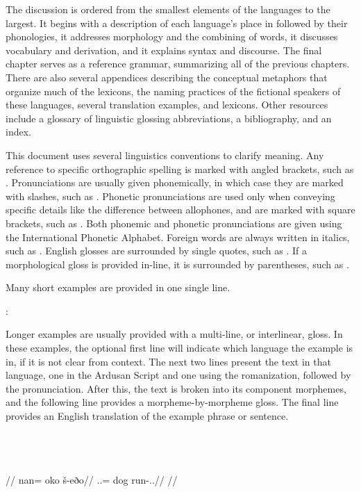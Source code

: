 The discussion is ordered from the smallest elements of the languages to the largest. It begins with a description of each language's place in \landn{} followed by their phonologies, it addresses morphology and the combining of words, it discusses vocabulary and derivation, and it explains syntax and discourse. The final chapter serves as a reference grammar, summarizing all of the previous chapters. There are also several appendices describing the conceptual metaphors that organize much of the lexicons, the naming practices of the fictional speakers of these languages, several translation examples, and lexicons. Other resources include a glossary of linguistic glossing abbreviations, a bibliography, and an index.

This document uses several linguistics conventions to clarify meaning. Any reference to specific orthographic spelling is marked with angled brackets, such as . Pronunciations are usually given phonemically, in which case they are marked with slashes, such as . Phonetic pronunciations are used only when conveying specific details like the difference between allophones, and are marked with square brackets, such as . Both phonemic and phonetic pronunciations are given using the International Phonetic Alphabet. Foreign words are always written in italics, such as . English glosses are surrounded by single quotes, such as . If a morphological gloss is provided in-line, it is surrounded by parentheses, such as \gloss{\Inf}.

Many short examples are provided in one single line.

	\langtvk:     
\xe

Longer examples are usually provided with a multi-line, or interlinear, gloss. In these examples, the optional first line will indicate which language the example is in, if it is not clear from context. The next two lines present the text in that language, one in the Ardusan Script and one using the romanization, followed by the pronunciation. After this, the text is broken into its component morphemes, and the following line provides a morpheme-by-morpheme gloss. The final line provides an English translation of the example phrase or sentence.

	\begingl
		\glpreamble \langtvk\\
		\\
		\\
		//
		\gla nan= oko š-eðo//
		\glb \Pl.\An.\Top= dog run-\Ind.\Pst.\Prg//
		\glft {}//
	\endgl
\xe

